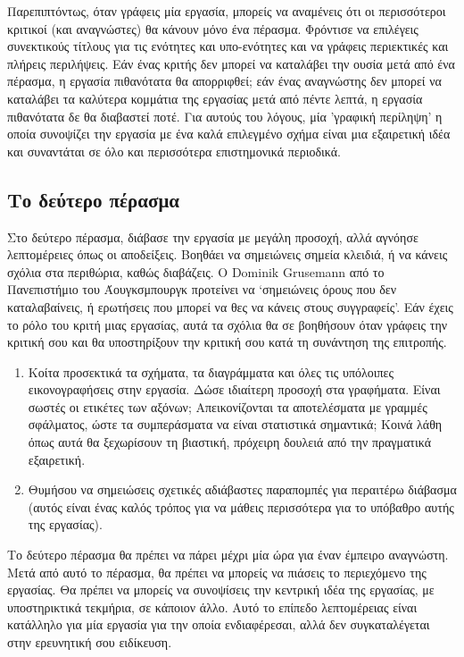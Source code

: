 \documentclass{article}
\begin{document}
\par
Παρεπιπτόντως, όταν γράφεις μία εργασία, μπορείς να αναμένεις ότι οι περισσότεροι κριτικοί (και αναγνώστες) θα κάνουν μόνο ένα πέρασμα. Φρόντισε να επιλέγεις συνεκτικούς τίτλους για τις ενότητες και υπο-ενότητες και να γράφεις περιεκτικές και πλήρεις περιλήψεις. Εάν ένας κριτής δεν μπορεί να καταλάβει την ουσία μετά από ένα πέρασμα, η εργασία πιθανότατα θα απορριφθεί; εάν ένας αναγνώστης δεν μπορεί να καταλάβει τα καλύτερα κομμάτια της εργασίας μετά από πέντε λεπτά, η εργασία πιθανότατα δε θα διαβαστεί ποτέ. Για αυτούς του λόγους, μία 'γραφική περίληψη' η οποία συνοψίζει την εργασία με ένα καλά επιλεγμένο σχήμα είναι μια εξαιρετική ιδέα και συναντάται σε όλο και περισσότερα επιστημονικά περιοδικά.
\subsection{Το δεύτερο πέρασμα}
\par
Στο δεύτερο πέρασμα, διάβασε την εργασία με μεγάλη προσοχή, αλλά αγνόησε λεπτομέρειες όπως οι αποδείξεις. Βοηθάει να σημειώνεις σημεία κλειδιά, ή να κάνεις σχόλια στα περιθώρια, καθώς διαβάζεις. Ο \textlatin{Dominik Grusemann} από το Πανεπιστήμιο του Άουγκσμπουργκ προτείνει να \enquote*{σημειώνεις όρους που δεν καταλαβαίνεις, ή ερωτήσεις που μπορεί να θες να κάνεις στους συγγραφείς}. Εάν έχεις το ρόλο του κριτή μιας εργασίας, αυτά τα σχόλια θα σε βοηθήσουν όταν γράφεις την κριτική σου και θα υποστηρίξουν την κριτική σου κατά τη συνάντηση της επιτροπής.
\begin{enumerate}
    \item Κοίτα προσεκτικά τα σχήματα, τα διαγράμματα και όλες τις υπόλοιπες εικονογραφήσεις στην εργασία. Δώσε ιδιαίτερη προσοχή στα γραφήματα. Είναι σωστές οι ετικέτες των αξόνων\textlatin{;} Απεικονίζονται τα αποτελέσματα με γραμμές σφάλματος, ώστε τα συμπεράσματα να είναι στατιστικά σημαντικά\textlatin{;} Κοινά λάθη όπως αυτά θα ξεχωρίσουν τη βιαστική, πρόχειρη δουλειά από την πραγματικά εξαιρετική.
    \item Θυμήσου να σημειώσεις σχετικές αδιάβαστες παραπομπές για περαιτέρω διάβασμα (αυτός είναι ένας καλός τρόπος για να μάθεις περισσότερα για το υπόβαθρο αυτής της εργασίας).
\end{enumerate}
\par
Το δεύτερο πέρασμα θα πρέπει να πάρει μέχρι μία ώρα για έναν έμπειρο αναγνώστη. Μετά από αυτό το πέρασμα, θα πρέπει να μπορείς να πιάσεις το περιεχόμενο της εργασίας. Θα πρέπει να μπορείς να συνοψίσεις την κεντρική ιδέα της εργασίας, με υποστηρικτικά τεκμήρια, σε κάποιον άλλο. Αυτό το επίπεδο λεπτομέρειας είναι κατάλληλο για μία εργασία για την οποία ενδιαφέρεσαι, αλλά δεν συγκαταλέγεται στην ερευνητική σου ειδίκευση.
\end{document}
